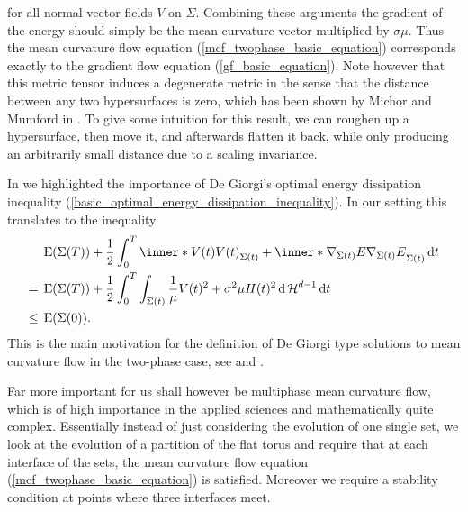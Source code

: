 for all normal vector fields $ V $ on $ \Sigma $.
Combining these arguments the gradient of the energy should simply be the mean 
curvature vector multiplied by $ \sigma \mu $.
Thus the mean curvature flow equation (\ref{mcf_twophase_basic_equation}) 
corresponds exactly to the gradient flow equation (\ref{gf_basic_equation}).
Note however that this metric tensor induces a degenerate metric in the sense 
that the distance between any two hypersurfaces is zero, which has been shown 
by Michor and Mumford 
in \cite{michor_mumford_riemannian_geometries_on_spaces_of_plane_curves}. 
To give some intuition for this result, we can roughen up a hypersurface, then 
move it, and 
afterwards flatten 
it back, while only producing an arbitrarily small distance due to a scaling 
invariance.

In  we highlighted the importance of
De Giorgi's optimal energy dissipation inequality (\ref{basic_optimal_energy_dissipation_inequality}). In our setting  this translates to the inequality
\begin{align*}
	& \energy ( \Sigma ( T ) )
	+
	\frac{ 1 }{ 2 }
	\int_{ 0 }^{ T }
		\inner*{ V ( t ) }{ V ( t ) }_{ \Sigma ( t ) }
		+
		\inner*{ \nabla_{ \Sigma ( t ) } E }{ \nabla_{ \Sigma ( t ) } E }_{ 
		\Sigma ( t ) }
	\dd{ t }
	\\
	={}
	&\energy ( \Sigma ( T ) )
	+
	\frac{ 1 }{ 2 }
	\int_{ 0 }^{ T }
		\int_{ \Sigma (t ) }
			\frac{ 1 }{ \mu }
			V( t )^{ 2 } 
			+
			\sigma^{ 2 } \mu 
			H( t ) ^{ 2 }
		\dd{ \hm^{ d - 1 } }
	\dd{ t }
	\\
	\leq{} &
	\energy ( \Sigma ( 0 ) ).
\end{align*}
This is the main motivation for the definition of De Giorgi type solutions to 
mean curvature flow in the two-phase case, see 
 and 
.

Far more important for us shall however be multiphase mean curvature flow, 
which is of high importance in the applied sciences and mathematically quite 
complex. 
Essentially instead of just considering the evolution of one single set, we 
look at the evolution of a partition of the flat torus and require that at each 
interface of the sets, the mean curvature flow equation 
(\ref{mcf_twophase_basic_equation}) is satisfied. Moreover we require a 
stability condition at points where three interfaces meet.

